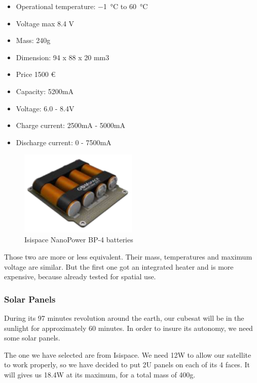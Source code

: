 \begin{itemize}
	\item Operational temperature: \SI{-1}{\degreeCelsius} to \SI{60}{\degreeCelsius}
	\item Voltage max 8.4 V
	\item Mass: 240g
	\item Dimension: 94 x 88 x 20 mm3
	\item Price 1500 \euro
	\item Capacity: 5200mA
	\item Voltage: 6.0 - 8.4V
	\item Charge current: 2500mA - 5000mA
	\item Discharge current: 0 - 7500mA
\end{itemize}

\begin{figure}[h]
	\centering
	\includegraphics[width=0.5\textwidth]{img/Isispace_nanopower_bp4.png}
	\caption{Isispace NanoPower BP-4 batteries}
	\label{fig:Isispace_nanopower_bp4}
\end{figure}

Those two are more or less equivalent. Their mass, temperatures and maximum voltage
are similar. But the first one got an integrated heater and is more expensive,
because already tested for spatial use.

\subsubsection{Solar Panels}

During its 97 minutes revolution around the earth, our cubesat will be in the
sunlight for approximately 60 minutes. In order to insure its autonomy, we
need some solar panels.

The one we have selected are from Isispace. We need 12W to allow our satellite
to work properly, so we have decided to put 2U panels on each of its 4 faces.
It will gives us 18.4W at its maximum, for a total mass of 400g.

